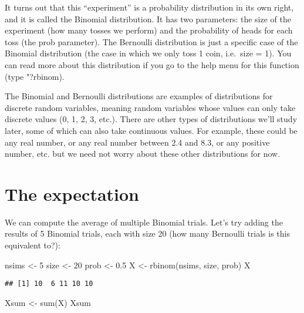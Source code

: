 \documentclass[
]{book}
\newenvironment{Shaded}{\begin{snugshade}}{\end{snugshade}}
\newcommand{\DecValTok}[1]{\textcolor[rgb]{0.00,0.00,0.81}{#1}}
\newcommand{\FloatTok}[1]{\textcolor[rgb]{0.00,0.00,0.81}{#1}}
\newcommand{\FunctionTok}[1]{\textcolor[rgb]{0.00,0.00,0.00}{#1}}
\newcommand{\NormalTok}[1]{#1}
\newcommand{\OtherTok}[1]{\textcolor[rgb]{0.56,0.35,0.01}{#1}}
\begin{document}
It turns out that this ``experiment'' is a probability distribution in its own right, and it is called the Binomial distribution. It has two parameters: the size of the experiment (how many tosses we perform) and the probability of heads for each toss (the prob parameter). The Bernoulli distribution is just a specific case of the Binomial distribution (the case in which we only toss 1 coin, i.e.~size = 1). You can read more about this distribution if you go to the help menu for this function (type "?rbinom).

The Binomial and Bernoulli distributions are examples of distributions for discrete random variables, meaning random variables whose values can only take discrete values (0, 1, 2, 3, etc.). There are other types of distributions we'll study later, some of which can also take continuous values. For example, these could be any real number, or any real number between 2.4 and 8.3, or any positive number, etc. but we need not worry about these other distributions for now.

\hypertarget{the-expectation}{%
\section{The expectation}\label{the-expectation}}

We can compute the average of multiple Binomial trials. Let's try adding the results of 5 Binomial trials, each with size 20 (how many Bernoulli trials is this equivalent to?):

\begin{Shaded}
\begin{Highlighting}[]
\NormalTok{nsims }\OtherTok{\textless{}{-}} \DecValTok{5}
\NormalTok{size }\OtherTok{\textless{}{-}} \DecValTok{20}
\NormalTok{prob }\OtherTok{\textless{}{-}} \FloatTok{0.5}
\NormalTok{X }\OtherTok{\textless{}{-}} \FunctionTok{rbinom}\NormalTok{(nsims, size, prob)}
\NormalTok{X}
\end{Highlighting}
\end{Shaded}

\begin{verbatim}
## [1] 10  6 11 10 10
\end{verbatim}

\begin{Shaded}
\begin{Highlighting}[]
\NormalTok{Xsum }\OtherTok{\textless{}{-}} \FunctionTok{sum}\NormalTok{(X)}
\NormalTok{Xsum}
\end{Highlighting}
\end{Shaded}
\end{document}

